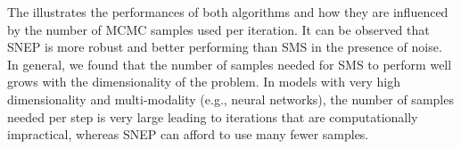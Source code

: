 The  illustrates the performances of both algorithms and how they are influenced by the number of MCMC samples used per iteration. It can be observed that SNEP is more robust and better performing than SMS in the presence of noise.
In general, we found that the number of samples needed for SMS to perform well grows with the dimensionality of the problem. In models with very high dimensionality and multi-modality (e.g., neural networks), the number of samples needed per step is very large leading to iterations that are computationally impractical, whereas SNEP can afford to use many fewer samples.\\


